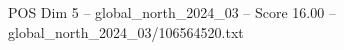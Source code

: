 \begin{textsample}{POS Dim 5 – global\_north\_2024\_03 – Score 16.00 – global\_north\_2024\_03/106564520.txt}
\end{textsample}
